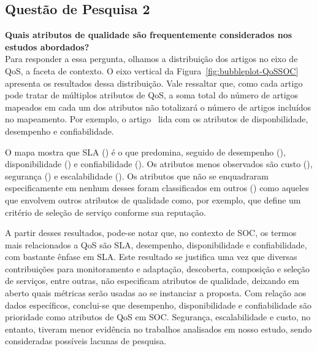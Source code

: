 \subsection{Quest\~{a}o de Pesquisa 2}
\textbf{Quais atributos de qualidade são frequentemente considerados nos estudos abordados?}
\\[0.01in]

Para responder a essa pergunta, olhamos a distribui\c{c}\~{a}o dos artigos no eixo de QoS, a faceta de contexto. O eixo vertical da Figura~\ref{fig:bubbleplot-QoSSOC} apresenta os resultados dessa distribui\c{c}\~{a}o. Vale ressaltar que, como cada artigo pode tratar de m\'{u}ltiplos atributos de QoS, a soma total do n\'{u}mero de artigos mapeados em cada um dos atributos n\~{a}o totalizar\'{a} o n\'{u}mero de artigos inclu\'{i}dos no mapeamento. Por exemplo, o artigo~\cite{DBLP:journals/tse/CalinescuGKMT11} lida com os atributos de disponbilidade, desempenho e confiabilidade. 

O mapa mostra que SLA (\SLA) \'{e} o que predomina, seguido de desempenho (\Desempenho), disponibilidade (\Disponibilidade) e confiabilidade (\Confiabilidade). Os atributos menos observados s\~{a}o custo (\Custo), seguran\c{c}a (\Seguranca) e escalabilidade (\Escalabilidade). Os atributos que n\~{a}o se enquadraram especificamente em nenhum desses foram classificados em outros (\Outros) como aqueles que envolvem outros atributos de qualidade como, por exemplo, \cite{6036406} que define um crit\'{e}rio de sele\c{c}\~{a}o de servi\c{c}o conforme sua reputa\c{c}\~{a}o. 

A partir desses resultados, pode-se notar que, no contexto de SOC, os termos mais relacionados a QoS s\~{a}o SLA, desempenho, disponibilidade e confiabilidade, com bastante \^{e}nfase em SLA. Este resultado se justifica uma vez que diversas contribuições para monitoramento e adaptação, descoberta, composição e seleção de serviços, entre outras, não especificam atributos de qualidade, deixando em aberto quais métricas serão usadas ao se instanciar a proposta. Com relação aos dados específicos, conclui-se que desempenho, disponibilidade e confiabilidade s\~{a}o prioridade como atributos de QoS em SOC. Seguran\c{c}a, escalabilidade e custo, no entanto, tiveram menor evid\^{e}ncia no trabalhos analisados em nosso estudo, sendo consideradas possíveis lacunas de pesquisa.